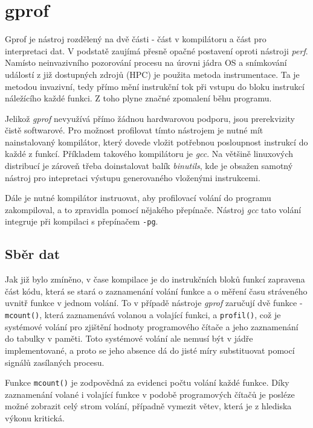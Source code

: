 \documentclass[czech,BP]{thesiskiv}
\begin{document}
\section{gprof}\label{subsec:gprof}

Gprof je nástroj rozdělený na dvě části - část v kompilátoru a část pro interpretaci dat. V podstatě zaujímá přesně opačné postavení oproti nástroji \emph{perf}. Namísto neinvazivního pozorování procesu na úrovni jádra OS a snímkování událostí z již dostupných zdrojů (HPC) je použita metoda instrumentace. Ta je metodou invazivní, tedy přímo mění instrukční tok při vstupu do bloku instrukcí náležícího každé funkci. Z toho plyne značné zpomalení běhu programu.

Jelikož \emph{gprof} nevyužívá přímo žádnou hardwarovou podporu, jsou prerekvizity čistě softwarové. Pro možnost profilovat tímto nástrojem je nutné mít nainstalovaný kompilátor, který dovede vložit potřebnou posloupnost instrukcí do každé z funkcí. Příkladem takového kompilátoru je \emph{gcc}. Na většině linuxových distribucí je zároveň třeba doinstalovat balík \emph{binutils}, kde je obsažen samotný nástroj pro intepretaci výstupu generovaného vloženými instrukcemi.

Dále je nutné kompilátor instruovat, aby profilovací volání do programu zakompiloval, a to zpravidla pomocí nějakého přepínače. Nástroj \emph{gcc} tato volání integruje při kompilaci s přepínačem \texttt{-pg}.

\subsection*{Sběr dat}\label{subsec:gprofgather}

Jak již bylo zmíněno, v čase kompilace je do instrukčních bloků funkcí zapravena část kódu, která se stará o zaznamenání volání funkce a o měření času stráveného uvnitř funkce v jednom volání. To v případě nástroje \emph{gprof} zaručují dvě funkce - \texttt{mcount()}, která zaznamenává volanou a volající funkci, a \texttt{profil()}, což je systémové volání pro zjištění hodnoty programového čítače a jeho zaznamenání do tabulky v paměti\cite{gprof2}. Toto systémové volání ale nemusí být v jádře implementované, a proto se jeho absence dá do jisté míry substituovat pomocí signálů zasílaných procesu.

Funkce \texttt{mcount()} je zodpovědná za evidenci počtu volání každé funkce. Díky zaznamenání volané i volající funkce v podobě programových čítačů je posléze možné zobrazit celý strom volání, případně vymezit větev, která je z hlediska výkonu kritická.
\end{document}
